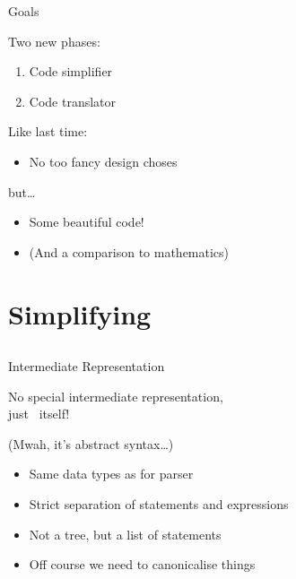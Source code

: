 \begin{frame}{Goals}

  Two new phases:

  \begin{enumerate}
    \item Code simplifier
    \item Code translator
  \end{enumerate}

  \pause

  Like last time:

  \begin{itemize}
    \item No too fancy design choses
  \end{itemize}

  but\ldots
  \pause

  \begin{itemize}
    \item Some beautiful code!
    \item (And a comparison to mathematics)
  \end{itemize}

\end{frame}

\section{Simplifying}
\subsection*{}

\begin{frame}[fragile]{Intermediate Representation}
  
  No special intermediate representation,\\
  just \SPL\ itself!

  \pause
  \medskip

  (Mwah, it's abstract syntax\ldots)

  \begin{itemize}
      \item Same data types as for parser
      \item Strict separation of statements and expressions
      \item Not a tree, but a list of statements
      \item Off course we need to canonicalise things
  \end{itemize}

\end{frame}

